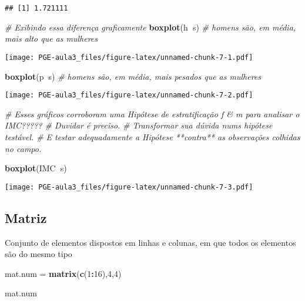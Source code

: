 \documentclass[]{article}
\newenvironment{Shaded}{\begin{snugshade}}{\end{snugshade}}
\newcommand{\KeywordTok}[1]{\textcolor[rgb]{0.13,0.29,0.53}{\textbf{#1}}}
\newcommand{\DecValTok}[1]{\textcolor[rgb]{0.00,0.00,0.81}{#1}}
\newcommand{\StringTok}[1]{\textcolor[rgb]{0.31,0.60,0.02}{#1}}
\newcommand{\CommentTok}[1]{\textcolor[rgb]{0.56,0.35,0.01}{\textit{#1}}}
\newcommand{\OperatorTok}[1]{\textcolor[rgb]{0.81,0.36,0.00}{\textbf{#1}}}
\newcommand{\NormalTok}[1]{#1}
\begin{document}
\begin{verbatim}
## [1] 1.721111
\end{verbatim}

\begin{Shaded}
\begin{Highlighting}[]
\CommentTok{# Exibindo essa diferença graficamente}
\KeywordTok{boxplot}\NormalTok{(h}\OperatorTok{~}\NormalTok{s) }\CommentTok{# homens são, em média, mais alto que as mulheres}
\end{Highlighting}
\end{Shaded}

\texttt{[image: PGE-aula3\_files/figure-latex/unnamed-chunk-7-1.pdf]}

\begin{Shaded}
\begin{Highlighting}[]
\KeywordTok{boxplot}\NormalTok{(p}\OperatorTok{~}\NormalTok{s) }\CommentTok{# homens são, em média, mais pesados que as mulheres}
\end{Highlighting}
\end{Shaded}

\texttt{[image: PGE-aula3\_files/figure-latex/unnamed-chunk-7-2.pdf]}

\begin{Shaded}
\begin{Highlighting}[]
\CommentTok{# Esses gráficos corroboram uma Hipótese de estratificação f & m para analisar o IMC?????}
\CommentTok{# Duvidar é preciso.}
\CommentTok{# Transformar sua dúvida nums hipótese testável.}
\CommentTok{# E testar adequadamente a Hipótese **contra** as observações colhidas no campo.}

\KeywordTok{boxplot}\NormalTok{(IMC}\OperatorTok{~}\NormalTok{s)}
\end{Highlighting}
\end{Shaded}

\texttt{[image: PGE-aula3\_files/figure-latex/unnamed-chunk-7-3.pdf]}

\subsection{Matriz}\label{matriz}

Conjunto de elementos dispostos em linhas e colunas, em que todos os
elementos são do mesmo tipo

\begin{Shaded}
\begin{Highlighting}[]
\NormalTok{mat.num  =}\StringTok{ }\KeywordTok{matrix}\NormalTok{(}\KeywordTok{c}\NormalTok{(}\DecValTok{1}\OperatorTok{:}\DecValTok{16}\NormalTok{),}\DecValTok{4}\NormalTok{,}\DecValTok{4}\NormalTok{)}

\NormalTok{mat.num}
\end{Highlighting}
\end{Shaded}
\end{document}
